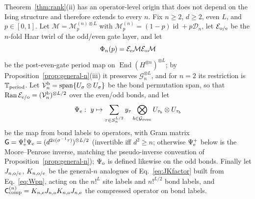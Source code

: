 \documentclass[aps,prx,reprint,superscriptaddress,nobibnotes,longbibliography]{revtex4-2}
\theoremstyle{remark}
\newcommand{\id}{\operatorname{id}}
\newcommand{\Ran}{\operatorname{Ran}}
\newcommand{\Ccomp}{\mathsf C_{\rm comp}}
\newcommand{\Tper}{\mathbb T_{\rm period}}
\begin{document}
Theorem~\ref{thm:rank}(ii) has an operator-level origin that does not depend on the Ising structure and therefore extends to every $n$.  Fix $n\ge2$, $d\ge2$, even $L$, and $p\in[0,1]$.  Let $\mathcal M=\mathcal M_p^{(n)\otimes L}$ with $\mathcal M_p^{(n)}=(1-p)\id+p\mathcal D_n$, let $\mathcal E_{\rm o/e}$ be the $n$-fold Haar twirl of the odd/even gate layer, and let
\begin{equation}
 \Phi_n(p)=\mathcal E_{\rm e}\mathcal M\mathcal E_{\rm o}\mathcal M
 \label{eq:Phin}
\end{equation}
be the post-even-gate period map on $\operatorname{End}(H^{\otimes n})^{\otimes L}$; by Proposition~\ref{prop:general-n}(iii) it preserves $\mathcal G_n^{\otimes L}$, and for $n=2$ its restriction is $\Tper$.  Let $\mathcal V_n^{\rm b}=\operatorname{span}\{U_\sigma\otimes U_\sigma\}$ be the bond permutation span, so that $\Ran\mathcal E_{\rm e/o}=(\mathcal V_n^{\rm b})^{\otimes L/2}$ over the even/odd bonds, and let
\begin{equation}
 \Psi_{\rm e}:\ y\mapsto\sum_{\tau\in S_n^{L/2}}y_\tau\bigotimes_{b\in\mathcal G_{\rm even}}U_{\tau_b}\otimes U_{\tau_b}
 \label{eq:Psie}
\end{equation}
be the map from bond labels to operators, with Gram matrix $\mathsf G=\Psi_{\rm e}^\dagger\Psi_{\rm e}=(d^{2c(\sigma^{-1}\tau)})^{\otimes L/2}$ (invertible iff $d^2\ge n$; otherwise $\Psi_{\rm e}^+$ below is the Moore--Penrose inverse, matching the pseudo-inverse convention of Proposition~\ref{prop:general-n}); $\Psi_{\rm o}$ is defined likewise on the odd bonds.  Finally let $J_{n,{\rm o/e}}$, $K_{n,{\rm o/e}}$ be the general-$n$ analogues of Eq.~\eqref{eq:JKfactor} built from Eq.~\eqref{eq:Wpn}, acting on the $n!^L$ site labels and $n!^{L/2}$ bond labels, and $\Ccomp^{(n)}=K_{n,{\rm e}}J_{n,{\rm o}}K_{n,{\rm o}}J_{n,{\rm e}}$ the compressed operator on bond labels.
\end{document}
